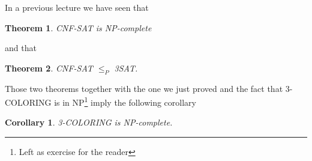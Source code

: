 \documentclass{article}
\newcommand{\theoremname}{Theorem}
\newcommand{\corollaryname}{Corollary}
\newtheorem{theorem}{\theoremname}
\newtheorem{corollary}{\corollaryname}
\begin{document}
In a previous lecture we have seen that
\begin{theorem}
	CNF-SAT is NP-complete
\end{theorem}
and that
\begin{theorem}
	CNF-SAT $\le_P$ 3SAT.
\end{theorem}
Those two theorems together with the one we just proved and the fact that
3-COLORING is in NP\footnote{Left as exercise for the reader}
imply the following corollary
\begin{corollary}
	3-COLORING is NP-complete.
\end{corollary}
\end{document}
